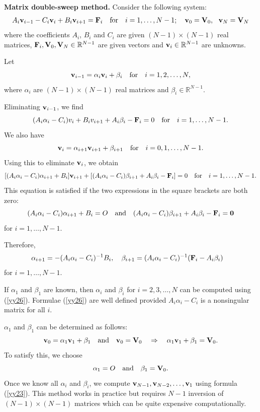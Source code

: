 \textbf{Matrix double-sweep method.}
Consider the following system:
\begin{equation}
A_{i}{\bf v}_{i-1}-C_{i}{\bf v}_{i}+B_{i}{\bf v}_{i+1}={\bf F}_{i} \quad \hbox{for}\quad i=1, \dots, N-1;
\quad {\bf v}_{0}={{\bf V}_{0}}, \ \ {\bf v}_{N}={{\bf V}_{N}} \label{yy22}
\end{equation}
where the coefficients $A_{i}$, $B_{i}$ and $C_{i}$ are given $(N-1)\times(N-1)$ real matrices,
${\bf F}_{i}, {{\bf V}_{0}}, {{\bf V}_{N}}\in\mathbb{R}^{N-1}$ are given vectors and ${\bf v}_{i}\in\mathbb{R}^{N-1}$ are unknowns.

Let
\begin{equation}
{\bf v}_{i-1}=\alpha_{i}{\bf v}_{i}+\beta_{i}  \quad  \hbox{for} \quad
i=1, 2, \dots, N, \label{yy23}
\end{equation}
where $\alpha_{i}$ are $(N-1)\times(N-1)$ real matrices
and $\beta_{i}\in\mathbb{R}^{N-1}$.

Eliminating ${\bf v}_{i-1}$, we find
\[
(A_{i}\alpha_{i}-C_{i})v_{i}+B_{i}v_{i+1}+A_{i}\beta_{i} - {\bf F}_{i}=0 \quad \hbox{for}\quad i=1, \dots, N-1.
\]
We also have
\[
{\bf v}_{i}=\alpha_{i+1}{\bf v}_{i+1}+\beta_{i+1}  \quad  \hbox{for} \quad
i=0, 1, \dots, N-1.
\]
Using this to eliminate ${\bf v}_{i}$, we obtain
\[
[(A_{i}\alpha_{i}-C_{i})\alpha_{i+1}+B_{i}]{\bf v}_{i+1}+[
(A_{i}\alpha_{i}-C_{i})\beta_{i+1}+A_{i}\beta_{i}-{\bf F}_{i}]=0 \quad \hbox{for}\quad i=1, \dots, N-1.
\]
This equation is satisfied if the two expressions in the square brackets are both zero:
\[
(A_{i}\alpha_{i}-C_{i})\alpha_{i+1}+B_{i}=O \quad \textrm{and} \quad
(A_{i}\alpha_{i}-C_{i})\beta_{i+1}+A_{i}\beta_{i}-{\bf F}_{i}=\mathbf{0}
\]
for $i=1, \dots, N-1$.

Therefore,
\begin{equation}
\alpha_{i+1}=-(A_{i}\alpha_{i}-C_{i})^{-1}B_{i}, \quad
\beta_{i+1}=(A_{i}\alpha_{i}-C_{i})^{-1}({\bf F}_{i}-A_{i}\beta_{i}) \quad
 \label{yy26}
\end{equation}
for $i=1, \dots, N-1$.

If $\alpha_{1}$ and  $\beta_{1}$ are known, then $\alpha_{i}$ and  $\beta_{i}$ for $i=2, 3, \dots, N$
can be computed using (\ref{yy26}). Formulae (\ref{yy26}) are well defined provided
$A_{i}\alpha_{i}-C_{i}$
is a nonsingular matrix for all $i$.

$\alpha_{1}$ and  $\beta_{1}$ can be determined as follows:
\[
{\bf v}_{0}= \alpha_{1}{\bf v}_{1}+\beta_{1} \quad \hbox{and} \quad {\bf v}_{0}={\bf V}_{0} \quad \Rightarrow \quad
\alpha_{1}{\bf v}_{1}+\beta_{1}={\bf V}_{0}.
\]
To satisfy this, we choose
\[
\alpha_{1}=O \quad \textrm{and} \quad \beta_{1}={\bf V}_{0}.
\]
Once we know all $\alpha_{i}$
and $\beta_{i}$, we compute ${\bf v}_{N-1}, {\bf v}_{N-2}, \dots, {\bf v}_{1}$ using formula (\ref{yy23}).
This method works in practice but requires $N-1$ inversion of $(N-1)\times(N-1)$ matrices which
can be quite expensive computationally.

